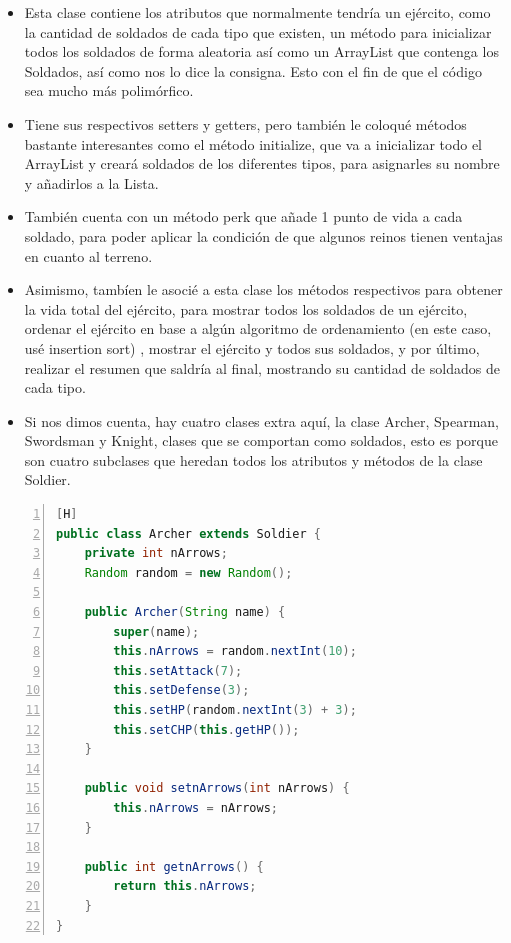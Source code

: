 \documentclass{article}
\begin{document}
	\begin{itemize}	
		\item Esta clase contiene los atributos que normalmente tendría un ejército, como la cantidad de soldados de cada tipo que existen, un método para inicializar todos los soldados de forma aleatoria así como un ArrayList que contenga los Soldados, así como nos lo dice la consigna. Esto con el fin de que el código sea mucho más polimórfico.
		\item Tiene sus respectivos setters y getters, pero también le coloqué métodos bastante interesantes como el método initialize, que va a inicializar todo el ArrayList y creará soldados de los diferentes tipos, para asignarles su nombre y añadirlos a la Lista.
		\item También cuenta con un método perk que añade 1 punto de vida a cada soldado, para poder aplicar la condición de que algunos reinos tienen ventajas en cuanto al terreno.
		\item Asimismo, tambíen le asocié a esta clase los métodos respectivos para obtener la vida total del ejército, para mostrar todos los soldados de un ejército, ordenar el ejército en base a algún algoritmo de ordenamiento (en este caso, usé insertion sort) , mostrar el ejército y todos sus soldados, y por último, realizar el resumen que saldría al final, mostrando su cantidad de soldados de cada tipo. 
		\item Si nos dimos cuenta, hay cuatro clases extra aquí, la clase Archer, Spearman, Swordsman y Knight, clases que se comportan como soldados, esto es porque son cuatro subclases que heredan todos los atributos y métodos de la clase Soldier.
	\end{itemize}
	
	\begin{lstlisting}[language=java,caption={Subclase Archer}, numbers=left][H]
public class Archer extends Soldier {
    private int nArrows;
    Random random = new Random();

    public Archer(String name) {
        super(name);
        this.nArrows = random.nextInt(10);
        this.setAttack(7);
        this.setDefense(3);
        this.setHP(random.nextInt(3) + 3);
        this.setCHP(this.getHP());
    }

    public void setnArrows(int nArrows) {
        this.nArrows = nArrows;
    }

    public int getnArrows() {
        return this.nArrows;
    }
}
	\end{lstlisting}
	
\end{document}
